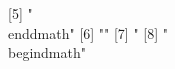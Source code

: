  [5] "\\end{dmath}"                                                                                                                                                                                                                                                                                                                                                                                                                                                                                                                                                                                                                                 
  [6] ""                                                                                                                                                                                                                                                                                                                                                                                                                                                                                                                                                                                                                                             
  [7] "%
  [8] "\\begin{dmath}"                                                                                                                                                                                                                                                                                                                                                                                                                                                                                                                                                                                                                               
